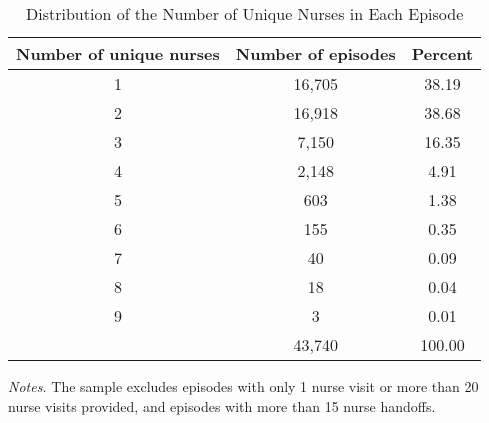 \documentclass[final,12pt, notitlepage]{article}
\begin{document}
\begin{singlespace}
\clearpage
\begin{table}[H]
\centering
\footnotesize
\caption{Distribution of the Number of Unique Nurses in Each Episode}
\label{tab:nsn}
\begin{threeparttable}
\begin{tabular}{ccc}
\toprule
Number of unique nurses & Number of episodes & Percent \\
\midrule
1 & 16,705 & 38.19 \\
2 & 16,918 & 38.68 \\
3 & 7,150  & 16.35 \\
4 & 2,148  & 4.91  \\
5 & 603    & 1.38  \\
6 & 155    & 0.35  \\
7 & 40     & 0.09  \\
8 & 18     & 0.04  \\
9 & 3      & 0.01 \\
\midrule
                        & 43,740             & 100.00 \\
\bottomrule
\end{tabular}
	\begin{tablenotes}
	\footnotesize
	\item \emph{Notes.} The sample excludes episodes with only 1 nurse visit or more than 20 nurse visits provided, and episodes with more than 15 nurse handoffs.
	\end{tablenotes}
\end{threeparttable}
\end{table}



\end{singlespace}
\end{document}
